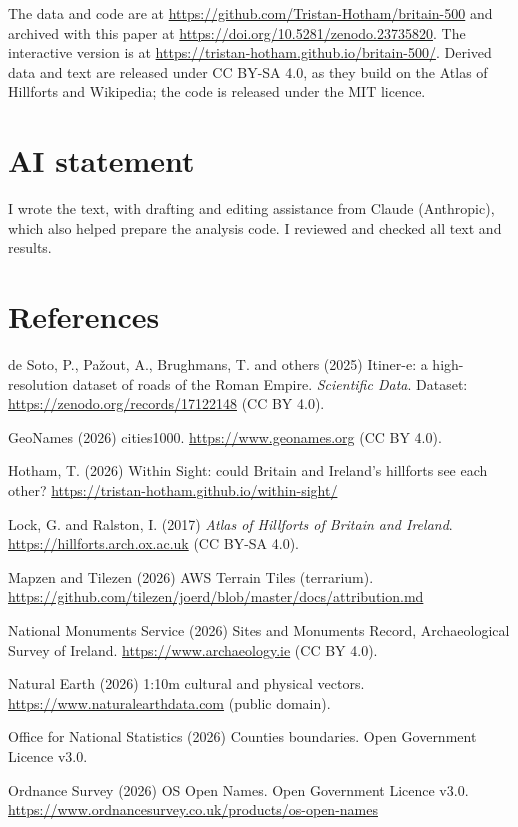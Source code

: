 \documentclass[11pt,a4paper]{article}
\begin{document}
The data and code are at \url{https://github.com/Tristan-Hotham/britain-500} and archived with this paper at \url{https://doi.org/10.5281/zenodo.23735820}. The interactive version is at \url{https://tristan-hotham.github.io/britain-500/}. Derived data and text are released under CC BY-SA 4.0, as they build on the Atlas of Hillforts and Wikipedia; the code is released under the MIT licence.

\section*{AI statement}

I wrote the text, with drafting and editing assistance from Claude (Anthropic), which also helped prepare the analysis code. I reviewed and checked all text and results.

\section*{References}
\footnotesize
de Soto, P., Pa\v{z}out, A., Brughmans, T. and others (2025) Itiner-e: a high-resolution dataset of roads of the Roman Empire. \textit{Scientific Data}. Dataset: \url{https://zenodo.org/records/17122148} (CC BY 4.0).

GeoNames (2026) cities1000. \url{https://www.geonames.org} (CC BY 4.0).

Hotham, T. (2026) Within Sight: could Britain and Ireland's hillforts see each other? \url{https://tristan-hotham.github.io/within-sight/}

Lock, G. and Ralston, I. (2017) \textit{Atlas of Hillforts of Britain and Ireland}. \url{https://hillforts.arch.ox.ac.uk} (CC BY-SA 4.0).

Mapzen and Tilezen (2026) AWS Terrain Tiles (terrarium). \url{https://github.com/tilezen/joerd/blob/master/docs/attribution.md}

National Monuments Service (2026) Sites and Monuments Record, Archaeological Survey of Ireland. \url{https://www.archaeology.ie} (CC BY 4.0).

Natural Earth (2026) 1:10m cultural and physical vectors. \url{https://www.naturalearthdata.com} (public domain).

Office for National Statistics (2026) Counties boundaries. Open Government Licence v3.0.

Ordnance Survey (2026) OS Open Names. Open Government Licence v3.0. \url{https://www.ordnancesurvey.co.uk/products/os-open-names}
\end{document}
